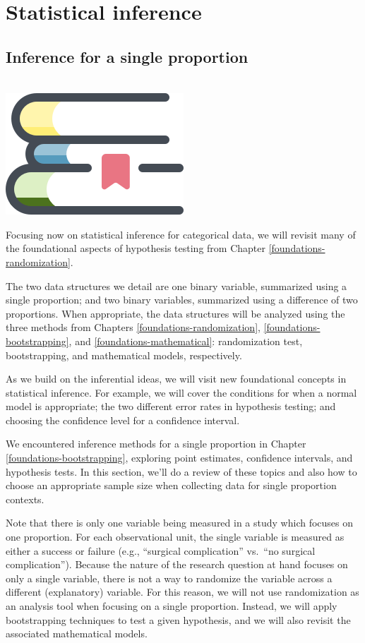 \documentclass[
  10pt,
  openany]{book}
\newenvironment{mdframedwithfootChapterintro}
{   
    \savenotes
    \begin{mdframed}[%
    topline=true, bottomline=true, linecolor=oiB, linewidth=1.4pt,
    rightline=false, leftline=false,
    backgroundcolor=oiLB]
    \renewcommand{\thempfootnote}{\arabic{footnote}}
    }
{
    \end{mdframed}
    \spewnotes
}
\newenvironment{chapterintro}{
\vspace{4mm}
\begin{mdframedwithfootChapterintro}
\begin{minipage}[t]{0.10\textwidth}
{$\:$ \\ \setkeys{Gin}{width=2.5em,keepaspectratio}\includegraphics{images/_icons/chapterintro.png}}
\end{minipage}
\hfill
\begin{minipage}[t]{0.90\textwidth}
\setlength{\parskip}{1em}
\large
}{\end{minipage}
\end{mdframedwithfootChapterintro}
\vspace{4mm}
}
\begin{document}
\hypertarget{part-statistical-inference}{%
\part{Statistical inference}\label{part-statistical-inference}}

\hypertarget{inference-one-prop}{%
\chapter{Inference for a single proportion}\label{inference-one-prop}}

\begin{chapterintro}
Focusing now on statistical inference for categorical data, we will revisit many of the foundational aspects of hypothesis testing from Chapter \ref{foundations-randomization}.

The two data structures we detail are one binary variable, summarized using a single proportion; and two binary variables, summarized using a difference of two proportions.
When appropriate, the data structures will be analyzed using the three methods from Chapters \ref{foundations-randomization}, \ref{foundations-bootstrapping}, and \ref{foundations-mathematical}: randomization test, bootstrapping, and mathematical models, respectively.

As we build on the inferential ideas, we will visit new foundational concepts in statistical inference.
For example, we will cover the conditions for when a normal model is appropriate; the two different error rates in hypothesis testing; and choosing the confidence level for a confidence interval.

\end{chapterintro}

We encountered inference methods for a single proportion in Chapter \ref{foundations-bootstrapping}, exploring point estimates, confidence intervals, and hypothesis tests.
In this section, we'll do a review of these topics and also how to choose an appropriate sample size when collecting data for single proportion contexts.

Note that there is only one variable being measured in a study which focuses on one proportion.
For each observational unit, the single variable is measured as either a success or failure (e.g., ``surgical complication'' vs.~``no surgical complication'').
Because the nature of the research question at hand focuses on only a single variable, there is not a way to randomize the variable across a different (explanatory) variable.
For this reason, we will not use randomization as an analysis tool when focusing on a single proportion.
Instead, we will apply bootstrapping techniques to test a given hypothesis, and we will also revisit the associated mathematical models.
\end{document}
